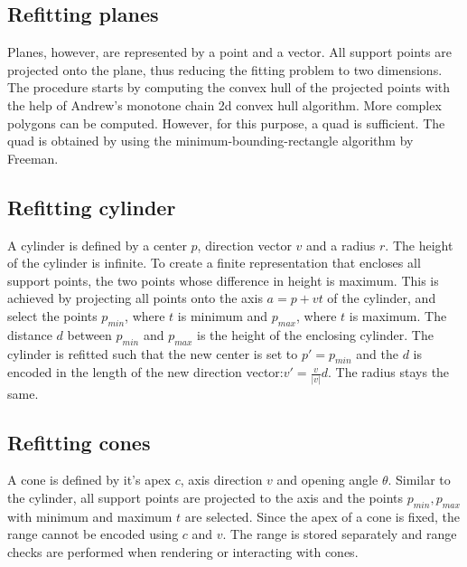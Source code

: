 \subsection{Refitting planes}
Planes, however, are represented by a point and a vector. All support points are projected onto the plane, thus reducing the fitting problem to two dimensions. The procedure starts by computing the convex hull of the projected points with the help of Andrew's monotone chain 2d convex hull algorithm\cite{andrew1979another}. 
More complex polygons can be computed. However, for this purpose, a quad is sufficient. The quad is obtained by using the minimum-bounding-rectangle algorithm by Freeman\cite{freeman1975determining}. 

\subsection{Refitting cylinder}
A cylinder is defined by a center $p$, direction vector $v$ and a radius $r$. The height of the cylinder is infinite. To create a finite representation that encloses all support points, the two points whose difference in height is maximum. This is achieved by projecting all points onto the axis $a = p + vt$ of the cylinder, and select the points $p_{min}$, where $t$ is minimum and $p_{max}$, where $t$ is maximum. The distance $d$ between $p_{min}$ and $p_{max}$ is the height of the enclosing cylinder. The cylinder is refitted such that the new center is set to $p' = p_{min}$ and the $d$ is encoded in the length of the new direction vector:$v' = \frac{v}{|v|}d$. The radius stays the same. 

\subsection{Refitting cones}
A cone is defined by it's apex $c$, axis direction $v$ and opening angle $\theta$. Similar to the cylinder, all support points are projected to the axis and the points $p_{min}, p_{max}$ with minimum and maximum $t$ are selected. Since the apex of a cone is fixed, the range cannot be encoded using $c$ and $v$. The range is stored separately and range checks are performed when rendering or interacting with cones. 


